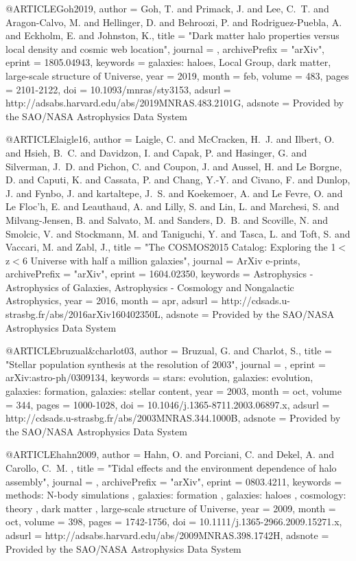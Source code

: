 \documentclass{aa}
\begin{document}
@ARTICLE{Goh2019,
   author = {{Goh}, T. and {Primack}, J. and {Lee}, C.~T. and {Aragon-Calvo}, M. and 
	{Hellinger}, D. and {Behroozi}, P. and {Rodriguez-Puebla}, A. and 
	{Eckholm}, E. and {Johnston}, K.},
    title = "{Dark matter halo properties versus local density and cosmic web location}",
  journal = {\mnras},
archivePrefix = "arXiv",
   eprint = {1805.04943},
 keywords = {galaxies: haloes, Local Group, dark matter, large-scale structure of Universe},
     year = 2019,
    month = feb,
   volume = 483,
    pages = {2101-2122},
      doi = {10.1093/mnras/sty3153},
   adsurl = {http://adsabs.harvard.edu/abs/2019MNRAS.483.2101G},
  adsnote = {Provided by the SAO/NASA Astrophysics Data System}
}


@ARTICLE{laigle16,
   author = {{Laigle}, C. and {McCracken}, H.~J. and {Ilbert}, O. and {Hsieh}, B.~C. and 
	{Davidzon}, I. and {Capak}, P. and {Hasinger}, G. and {Silverman}, J.~D. and 
	{Pichon}, C. and {Coupon}, J. and {Aussel}, H. and {Le Borgne}, D. and 
	{Caputi}, K. and {Cassata}, P. and {Chang}, Y.-Y. and {Civano}, F. and 
	{Dunlop}, J. and {Fynbo}, J. and {kartaltepe}, J.~S. and {Koekemoer}, A. and 
	{Le Fevre}, O. and {Le Floc'h}, E. and {Leauthaud}, A. and {Lilly}, S. and 
	{Lin}, L. and {Marchesi}, S. and {Milvang-Jensen}, B. and {Salvato}, M. and 
	{Sanders}, D.~B. and {Scoville}, N. and {Smolcic}, V. and {Stockmann}, M. and 
	{Taniguchi}, Y. and {Tasca}, L. and {Toft}, S. and {Vaccari}, M. and 
	{Zabl}, J.},
    title = "{The COSMOS2015 Catalog: Exploring the 1$\lt$z$\lt$6 Universe with half a million galaxies}",
  journal = {ArXiv e-prints},
archivePrefix = "arXiv",
   eprint = {1604.02350},
 keywords = {Astrophysics - Astrophysics of Galaxies, Astrophysics - Cosmology and Nongalactic Astrophysics},
     year = 2016,
    month = apr,
   adsurl = {http://cdsads.u-strasbg.fr/abs/2016arXiv160402350L},
  adsnote = {Provided by the SAO/NASA Astrophysics Data System}
}


@ARTICLE{bruzual&charlot03,
   author = {{Bruzual}, G. and {Charlot}, S.},
    title = "{Stellar population synthesis at the resolution of 2003}",
  journal = {\mnras},
   eprint = {arXiv:astro-ph/0309134},
 keywords = {stars: evolution, galaxies: evolution, galaxies: formation, galaxies: stellar content},
     year = 2003,
    month = oct,
   volume = 344,
    pages = {1000-1028},
      doi = {10.1046/j.1365-8711.2003.06897.x},
   adsurl = {http://cdsads.u-strasbg.fr/abs/2003MNRAS.344.1000B},
  adsnote = {Provided by the SAO/NASA Astrophysics Data System}
}

@ARTICLE{hahn2009,
   author = {{Hahn}, O. and {Porciani}, C. and {Dekel}, A. and {Carollo}, C.~M.
	},
    title = "{Tidal effects and the environment dependence of halo assembly}",
  journal = {\mnras},
archivePrefix = "arXiv",
   eprint = {0803.4211},
 keywords = {methods: N-body simulations , galaxies: formation , galaxies: haloes , cosmology: theory , dark matter , large-scale structure of Universe},
     year = 2009,
    month = oct,
   volume = 398,
    pages = {1742-1756},
      doi = {10.1111/j.1365-2966.2009.15271.x},
   adsurl = {http://adsabs.harvard.edu/abs/2009MNRAS.398.1742H},
  adsnote = {Provided by the SAO/NASA Astrophysics Data System}
}
\end{document}
